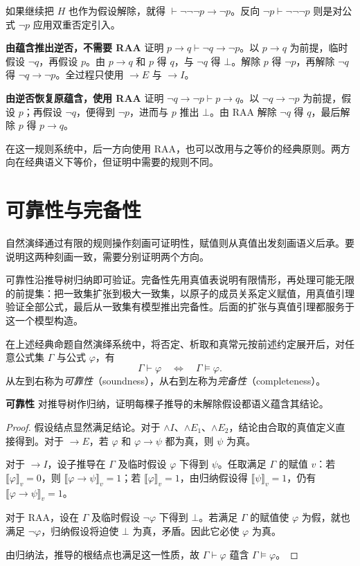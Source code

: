 \documentclass[lang=cn,a4paper,fontset=none,zihao=false,10pt,openany,twoside]{beautybook}
\numberwithin{algorithm}{chapter}
\newcommand{\val}[1]{\llbracket #1\rrbracket_v}
\begin{document}
如果继续把 $H$ 也作为假设解除，就得 $\vdash\neg\neg\neg p\to\neg p$。反向 $\neg p\vdash\neg\neg\neg p$ 则是对公式 $\neg p$ 应用双重否定引入。

\par\smallskip\noindent\textbf{由蕴含推出逆否，不需要 RAA}\quad 
证明 $p\to q\vdash\neg q\to\neg p$。以 $p\to q$ 为前提，临时假设 $\neg q$，再假设 $p$。由 $p\to q$ 和 $p$ 得 $q$，与 $\neg q$ 得 $\bot$。解除 $p$ 得 $\neg p$，再解除 $\neg q$ 得 $\neg q\to\neg p$。全过程只使用 $\to E$ 与 $\to I$。

\par\smallskip\noindent\textbf{由逆否恢复原蕴含，使用 RAA}\quad 
证明 $\neg q\to\neg p\vdash p\to q$。以 $\neg q\to\neg p$ 为前提，假设 $p$；再假设 $\neg q$，便得到 $\neg p$，进而与 $p$ 推出 $\bot$。由 RAA 解除 $\neg q$ 得 $q$，最后解除 $p$ 得 $p\to q$。

在这一规则系统中，后一方向使用 RAA，也可以改用与之等价的经典原则。两方向在经典语义下等价，但证明中需要的规则不同。

\section{可靠性与完备性}\label{sec:prop-metatheory}
自然演绎通过有限的规则操作刻画可证明性，赋值则从真值出发刻画语义后承。要说明这两种刻画一致，需要分别证明两个方向。

可靠性沿推导树归纳即可验证。完备性先用真值表说明有限情形，再处理可能无限的前提集：把一致集扩张到极大一致集，以原子的成员关系定义赋值，用真值引理验证全部公式，最后从一致集有模型推出完备性。后面的扩张与真值引理都服务于这一个模型构造。
\begin{theorem}[可靠性与完备性]\label{thm:prop-sound-complete}
在上述经典命题自然演绎系统中，将否定、析取和真常元按前述约定展开后，对任意公式集 $\Gamma$ 与公式 $\varphi$，有
\[
 \Gamma\vdash\varphi\quad\Longleftrightarrow\quad\Gamma\models\varphi.
\]
从左到右称为\emph{可靠性}（soundness），从右到左称为\emph{完备性}（completeness）。
\end{theorem}

\par\smallskip\noindent\textbf{可靠性}\quad
对推导树作归纳，证明每棵子推导的未解除假设都语义蕴含其结论。
\begin{proof}
假设结点显然满足结论。对于 $\wedge I$、$\wedge E_1$、$\wedge E_2$，结论由合取的真值定义直接得到。对于 $\to E$，若 $\varphi$ 和 $\varphi\to\psi$ 都为真，则 $\psi$ 为真。

对于 $\to I$，设子推导在 $\Gamma$ 及临时假设 $\varphi$ 下得到 $\psi$。任取满足 $\Gamma$ 的赋值 $v$：若 $\val\varphi=0$，则 $\val{\varphi\to\psi}=1$；若 $\val\varphi=1$，由归纳假设得 $\val\psi=1$，仍有 $\val{\varphi\to\psi}=1$。

对于 RAA，设在 $\Gamma$ 及临时假设 $\neg\varphi$ 下得到 $\bot$。若满足 $\Gamma$ 的赋值使 $\varphi$ 为假，就也满足 $\neg\varphi$，归纳假设将迫使 $\bot$ 为真，矛盾。因此它必使 $\varphi$ 为真。

由归纳法，推导的根结点也满足这一性质，故 $\Gamma\vdash\varphi$ 蕴含 $\Gamma\models\varphi$。
\end{proof}
\end{document}
